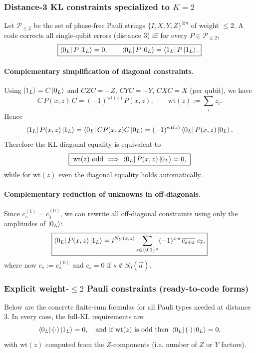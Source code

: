 \documentclass[11pt]{article}
\begin{document}
\subsubsection{Distance-3 KL constraints specialized to \(K=2\)}

Let \(\mathcal{P}_{\le 2}\) be the set of phase-free Pauli strings \(\{I,X,Y,Z\}^{\otimes n}\)
of weight \(\le 2\).
A code corrects all single-qubit errors (distance \(3\)) iff for every \(P\in\mathcal{P}_{\le 2}\),
\[
\boxed{
\bra{0_L}P\ket{1_L}=0,
\qquad
\bra{0_L}P\ket{0_L}=\bra{1_L}P\ket{1_L}.
}
\]

\paragraph{Complementary simplification of diagonal constraints.}
Using \(\ket{1_L}=C\ket{0_L}\) and \(C Z C = -Z\), \(C Y C = -Y\), \(C X C = X\) (per qubit), we have
\[
C\,P(x,z)\,C = (-1)^{\mathrm{wt}(z)}P(x,z),
\qquad \mathrm{wt}(z):=\sum_i z_i.
\]
Hence
\[
\bra{1_L}P(x,z)\ket{1_L}=\bra{0_L}C P(x,z) C\ket{0_L}
=(-1)^{\mathrm{wt}(z)}\bra{0_L}P(x,z)\ket{0_L}.
\]
Therefore the KL diagonal equality is equivalent to
\[
\boxed{\;\mathrm{wt}(z)\ \text{odd}\ \Longrightarrow\ \bra{0_L}P(x,z)\ket{0_L}=0,\;}
\]
while for \(\mathrm{wt}(z)\) even the diagonal equality holds automatically.

\paragraph{Complementary reduction of unknowns in off-diagonals.}
Since \(c^{(1)}_s=c^{(0)}_{\overline{s}}\), we can rewrite all off-diagonal constraints using only
the amplitudes of \(\ket{0_L}\):
\[
\boxed{
\bra{0_L}P(x,z)\ket{1_L}
=i^{N_Y(x,z)}\sum_{s\in\{0,1\}^n}(-1)^{z\cdot s}\,
\overline{c_{s\oplus x}}\;c_{\overline{s}},
}
\]
where now \(c_s:=c^{(0)}_s\) and \(c_s=0\) if \(s\notin S_0(\vec a)\).

\subsubsection{Explicit weight-\(\le 2\) Pauli constraints (ready-to-code forms)}

Below are the concrete finite-sum formulas for all Pauli types needed at distance \(3\).
In every case, the full-KL requirements are:
\[
\bra{0_L}(\cdot)\ket{1_L}=0,\quad
\text{and if }\mathrm{wt}(z)\text{ is odd then }\bra{0_L}(\cdot)\ket{0_L}=0,
\]
with \(\mathrm{wt}(z)\) computed from the \(Z\)-components (i.e. number of \(Z\) or \(Y\) factors).
\end{document}
